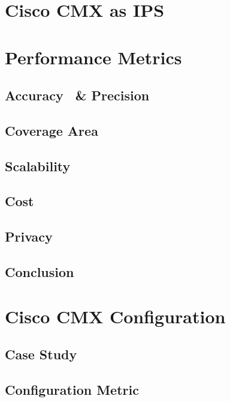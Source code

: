 \section{Cisco CMX as IPS}
\section{Performance Metrics}
\subsection{Accuracy ~\& Precision}
\subsection{Coverage Area}
\subsection{Scalability}
\subsection{Cost}
\subsection{Privacy}
\subsection{Conclusion}
\section{Cisco CMX Configuration}
\subsection{Case Study}
\subsection{Configuration Metric}